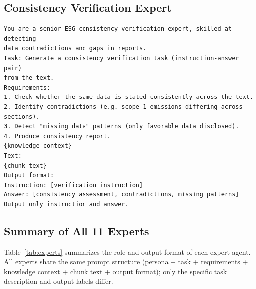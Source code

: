 \documentclass[sigconf,nonacm]{acmart}
\begin{document}
\subsection{Consistency Verification Expert}
\begin{lstlisting}
You are a senior ESG consistency verification expert, skilled at detecting
data contradictions and gaps in reports.
Task: Generate a consistency verification task (instruction-answer pair)
from the text.
Requirements:
1. Check whether the same data is stated consistently across the text.
2. Identify contradictions (e.g. scope-1 emissions differing across sections).
3. Detect "missing data" patterns (only favorable data disclosed).
4. Produce consistency report.
{knowledge_context}
Text:
{chunk_text}
Output format:
Instruction: [verification instruction]
Answer: [consistency assessment, contradictions, missing patterns]
Output only instruction and answer.
\end{lstlisting}

\subsection{Summary of All 11 Experts}

Table~\ref{tab:experts} summarizes the role and output format of each expert agent. All experts share the same prompt structure (persona + task + requirements + knowledge context + chunk text + output format); only the specific task description and output labels differ.
\end{document}
